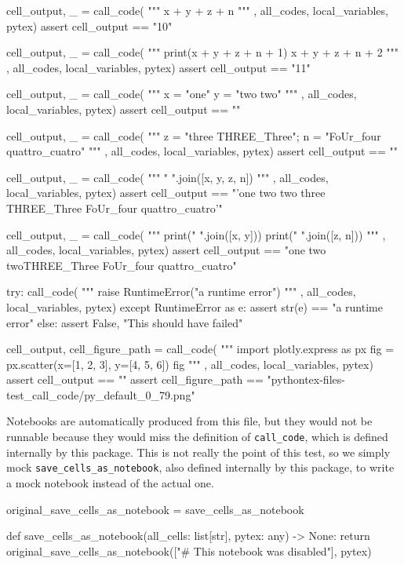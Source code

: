 \documentclass{book}
\begin{document}
\begin{pycell}
cell_output, _ = call_code(
"""
x + y + z + n
"""
,
all_codes, local_variables, pytex)
assert cell_output == "10"
\end{pycell}

\begin{pycell}
cell_output, _ = call_code(
"""
print(x + y + z + n + 1)
x + y + z + n + 2
"""
,
all_codes, local_variables, pytex)
assert cell_output == "11"
\end{pycell}

\begin{pycell}
cell_output, _ = call_code(
"""
x = "one"
y = "two two"
"""
,
all_codes, local_variables, pytex)
assert cell_output == ""
\end{pycell}

\begin{pycell}
cell_output, _ = call_code(
"""
z = "three THREE_Three"; n = "FoUr_four quattro_cuatro"
"""
,
all_codes, local_variables, pytex)
assert cell_output == ""
\end{pycell}

\begin{pycell}
cell_output, _ = call_code(
"""
" ".join([x, y, z, n])
"""
,
all_codes, local_variables, pytex)
assert cell_output == "'one two two three THREE_Three FoUr_four quattro_cuatro'"
\end{pycell}

\begin{pycell}
cell_output, _ = call_code(
"""
print(" ".join([x, y]))
print(" ".join([z, n]))
"""
,
all_codes, local_variables, pytex)
assert cell_output == "one two two\nthree THREE_Three FoUr_four quattro_cuatro"
\end{pycell}

\begin{pycell}
try:
    call_code(
"""
raise RuntimeError("a runtime error")
"""
,
all_codes, local_variables, pytex)
except RuntimeError as e:
    assert str(e) == "a runtime error"
else:
    assert False, "This should have failed"
\end{pycell}

\begin{pycell}
cell_output, cell_figure_path = call_code(
"""
import plotly.express as px
fig = px.scatter(x=[1, 2, 3], y=[4, 5, 6])
fig
"""
,
all_codes, local_variables, pytex)
assert cell_output == ""
assert cell_figure_path == "pythontex-files-test_call_code/py_default_0_79.png"
\end{pycell}

Notebooks are automatically produced from this file, but they would not be runnable because they would miss the definition of \texttt{call\_code}, which is defined internally by this package. This is not really the point of this test, so we simply mock \texttt{save\_cells\_as\_notebook}, also defined internally by this package, to write a mock notebook instead of the actual one.

\begin{pycell}
original_save_cells_as_notebook = save_cells_as_notebook

def save_cells_as_notebook(all_cells: list[str], pytex: any) -> None:
    return original_save_cells_as_notebook(["\n# This notebook was disabled"], pytex)
\end{pycell}
\end{document}
